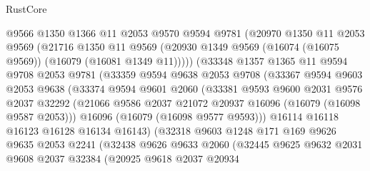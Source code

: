 \begin{lexlean}{RustCore}
\begin{coremodule}
                  @9566
                  @1350
                  @1366
                  @11
                  @2053
                  @9570
                  @9594
                  @9781
                  (@20970
                    @1350
                    @11
                    @2053
                    @9569
                    (@21716
                      @1350
                      @11
                      @9569
                      (@20930 @1349 @9569 (@16074 (@16075 @9569)) (@16079 (@16081 @1349 @11)))))
                  (@33348
                    @1357
                    @1365
                    @11
                    @9594
                    @9708
                    @2053
                    @9781
                    (@33359
                      @9594
                      @9638
                      @2053
                      @9708
                      (@33367
                        @9594
                        @9603
                        @2053
                        @9638
                        (@33374
                          @9594
                          @9601
                          @2060
                          (@33381
                            @9593
                            @9600
                            @2031
                            @9576
                            @2037
                            @32292
                            (@21066 @9586 @2037 @21072 @20937 @16096 (@16079 (@16098 @9587 @2053)))
                            @16096
                            (@16079 (@16098 @9577 @9593)))
                          @16114
                          @16118
                          @16123
                          @16128
                          @16134
                          @16143)
                        (@32318
                          @9603
                          @1248
                          @171
                          @169
                          @9626
                          @9635
                          @2053
                          @2241
                          (@32438
                            @9626
                            @9633
                            @2060
                            (@32445
                              @9625
                              @9632
                              @2031
                              @9608
                              @2037
                              @32384
                              (@20925
                                @9618
                                @2037
                                @20934

\end{coremodule}
\end{lexlean}

